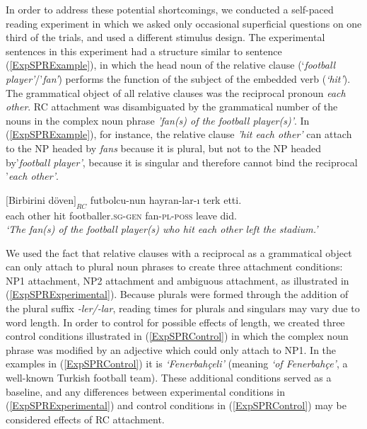 \documentclass[english, doc]{apa7}\usepackage[]{graphicx}\usepackage[]{color}
\begin{document}
In order to address these potential shortcomings, we conducted a self-paced reading experiment in which we asked only occasional superficial questions on one third of the trials, and used a different stimulus design. The experimental sentences in this experiment had a structure similar to sentence (\ref{ExpSPRExample}), in which the head noun of the relative clause (`\emph{football player'}/'\emph{fan'}) performs the function of the subject of the embedded verb (\emph{`hit'}). The grammatical object of all relative clauses was the reciprocal pronoun \emph{each other}. RC attachment was disambiguated by the grammatical number of the nouns in the complex noun phrase \emph{'fan(s) of the football player(s)'}. In (\ref{ExpSPRExample}), for instance, the relative clause \emph{'hit each other'} can attach to the NP headed by \emph{fans} because it is plural, but not to the NP headed by'\emph{football player'}, because it is singular and therefore cannot bind the reciprocal '\emph{each other'}.

\begin{exe}
\ex \label{ExpSPRExample}
\gll $[$Birbirini döven$]_{RC}$ futbolcu-nun hayran-lar-ı terk etti. \\
      {each other} hit  {footballer}.\textsc{sg}-\textsc{gen} {fan}-\textsc{pl}-\textsc{poss} leave did. \\
\textit{`The fan(s) of the football player(s) who hit each other left the stadium.'}
\end{exe}


We used the fact that relative clauses with a reciprocal as a grammatical object can only attach to plural noun phrases to create three attachment conditions: NP1 attachment, NP2 attachment and ambiguous attachment, as illustrated in (\ref{ExpSPRExperimental}). Because plurals were formed through the addition of the plural suffix \emph{-ler/-lar}, reading times for plurals and singulars may vary due to word length. In order to control for possible effects of length, we created three control conditions illustrated in (\ref{ExpSPRControl}) in which the complex noun phrase was modified by an adjective which could only attach to NP1. In the examples in (\ref{ExpSPRControl}) it is \emph{`Fenerbahçeli'} (meaning \emph{`of Fenerbahçe'}, a well-known Turkish football team). These additional conditions served as a baseline, and any differences between experimental conditions in (\ref{ExpSPRExperimental}) and control conditions in (\ref{ExpSPRControl}) may be considered effects of RC attachment.
\end{document}
